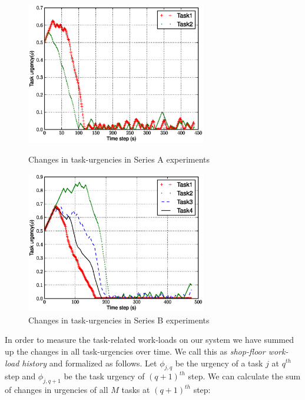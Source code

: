 \documentclass[smallcondensed]{svjour3}
\begin{document}
\begin{figure}
\centering
\includegraphics[width=0.7\textwidth, angle=0]
{images/global-8robots/PlotUrgencyLog-2010Apr30-095755.eps}
\caption{\small Changes in task-urgencies in Series A experiments}
\label{fig:raw-urgencies-SA} 
\centering
\includegraphics[width=0.7\textwidth, angle=0]{images/PlotUrgencyLog-2010May10-115549.eps}
\caption{\small Changes in task-urgencies in Series B experiments} 
\label{fig:raw-urgencies-SB} 
\end{figure}
In order to measure the task-related work-loads on our system we have summed up the changes in all task-urgencies over time. We call this as {\em shop-floor work-load history} and formalized as follows. Let $ \phi_{j, q}$ be the urgency of a task $j$ at $q^{th}$ step and $\phi_{j, q+1}$ be the task urgency of $(q+1)^{th}$ step. We can calculate the sum of changes in urgencies of all $M$ tasks at $(q+1)^{th}$ step:
\end{document}
